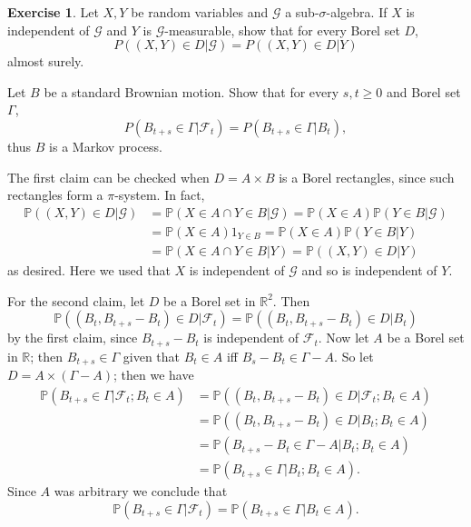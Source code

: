 \documentclass[10pt]{article}
\newcommand{\RR}{\mathbb{R}}
\newcommand{\PP}{\mathbb P}
\theoremstyle{definition}
\newtheorem{exer}{Exercise}
\begin{document}
\begin{exer}
Let $X,Y$ be random variables and $\mathcal G$ a sub-$\sigma$-algebra. If $X$ is independent of $\mathcal G$ and $Y$ is $\mathcal G$-measurable, show that for every Borel set $D$,
$$P((X, Y) \in D|\mathcal G) = P((X, Y) \in D|Y)$$
almost surely.

Let $B$ be a standard Brownian motion. Show that for every $s, t \geq 0$ and Borel set $\Gamma$,
$$P(B_{t+s} \in \Gamma|\mathcal F_t) = P(B_{t+s} \in \Gamma|B_t),$$
thus $B$ is a Markov process.
\end{exer}

The first claim can be checked when $D = A \times B$ is a Borel rectangles, since such rectangles form a $\pi$-system.
In fact,
\begin{align*}
\PP((X, Y) \in D|\mathcal G) &= \PP(X \in A \cap Y \in B|\mathcal G) = \PP(X \in A)\PP(Y \in B|\mathcal G)\\
&= \PP(X \in A)1_{Y \in B} = \PP(X \in A)\PP(Y \in B|Y)\\
&= \PP(X \in A \cap Y \in B|Y) = \PP((X, Y) \in D|Y)
\end{align*}
as desired. Here we used that $X$ is independent of $\mathcal G$ and so is independent of $Y$.

For the second claim, let $D$ be a Borel set in $\RR^2$. Then
$$\PP((B_t, B_{t+s} - B_t) \in D|\mathcal F_t) = \PP((B_t, B_{t+s} - B_t) \in D|B_t)$$
by the first claim, since $B_{t+s} - B_t$ is independent of $\mathcal F_t$.
Now let $A$ be a Borel set in $\RR$; then $B_{t + s} \in \Gamma$ given that $B_t \in A$ iff $B_s - B_t \in \Gamma - A$.
So let $D = A \times (\Gamma - A)$; then we have
\begin{align*}
\PP(B_{t+s} \in \Gamma|\mathcal F_t; B_t \in A) &= \PP((B_t, B_{t+s} - B_t) \in D|\mathcal F_t; B_t \in A) \\
&= \PP((B_t, B_{t+s} - B_t) \in D|B_t; B_t \in A) \\
&= \PP(B_{t+s} - B_t \in \Gamma - A|B_t; B_t \in A) \\
&= \PP(B_{t+s} \in \Gamma|B_t; B_t \in A).
\end{align*}
Since $A$ was arbitrary we conclude that
$$\PP(B_{t+s} \in \Gamma|\mathcal F_t) = \PP(B_{t+s} \in \Gamma|B_t \in A).$$
\end{document}
